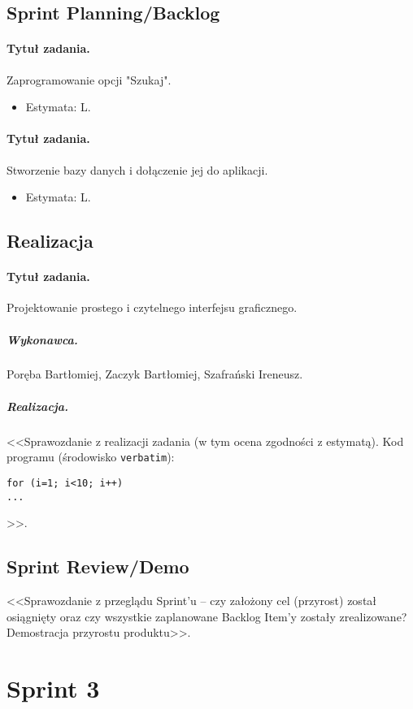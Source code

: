\documentclass[a4paper]{article}
\begin{document}
\subsection{Sprint Planning/Backlog}

\paragraph{Tytuł zadania.} Zaprogramowanie opcji "Szukaj".
\begin{itemize}
\item Estymata: L.
\end{itemize}

\paragraph{Tytuł zadania.} Stworzenie bazy danych i dołączenie jej do aplikacji.
\begin{itemize}
	\item Estymata: L.
\end{itemize}


\subsection{Realizacja}

\paragraph{Tytuł zadania.} Projektowanie prostego i czytelnego interfejsu graficznego.
\subparagraph{Wykonawca.} Poręba Bartłomiej, Zaczyk Bartłomiej, Szafrański Ireneusz.
\subparagraph{Realizacja.} <<Sprawozdanie z realizacji zadania (w tym ocena zgodności z estymatą). Kod programu (środowisko \texttt{verbatim}): \begin{verbatim}
for (i=1; i<10; i++)
...
\end{verbatim}>>.


\subsection{Sprint Review/Demo}
<<Sprawozdanie z przeglądu Sprint'u -- czy założony cel (przyrost) został osiągnięty oraz czy wszystkie zaplanowane Backlog Item'y zostały zrealizowane? Demostracja przyrostu produktu>>.


\section{Sprint 3}
\end{document}
